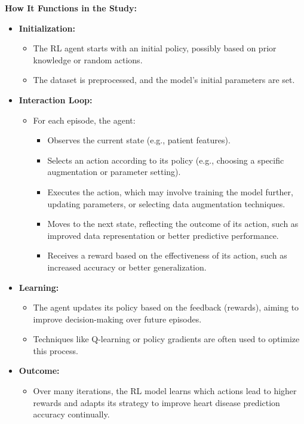 \noindent \textbf{How It Functions in the Study:}
\begin{itemize}
    \item \textbf{Initialization:}
        \begin{itemize}
            \item The RL agent starts with an initial policy, possibly based on prior knowledge or random actions.
            \item The dataset is preprocessed, and the model's initial parameters are set.
        \end{itemize}
    \item \textbf{Interaction Loop:}
        \begin{itemize}
            \item For each episode, the agent:
            \begin{itemize}
                \item Observes the current state (e.g., patient features).
                \item Selects an action according to its policy (e.g., choosing a specific augmentation or parameter setting).
                \item Executes the action, which may involve training the model further, updating parameters, or selecting data augmentation techniques.
                \item Moves to the next state, reflecting the outcome of its action, such as improved data representation or better predictive performance.
                \item Receives a reward based on the effectiveness of its action, such as increased accuracy or better generalization.
            \end{itemize}
        \end{itemize}
    \item \textbf{Learning:}
        \begin{itemize}
            \item The agent updates its policy based on the feedback (rewards), aiming to improve decision-making over future episodes.
            \item Techniques like Q-learning or policy gradients are often used to optimize this process.
        \end{itemize}
    \item \textbf{Outcome:}
        \begin{itemize}
            \item Over many iterations, the RL model learns which actions lead to higher rewards and adapts its strategy to improve heart disease prediction accuracy continually.
        \end{itemize}
\end{itemize}

